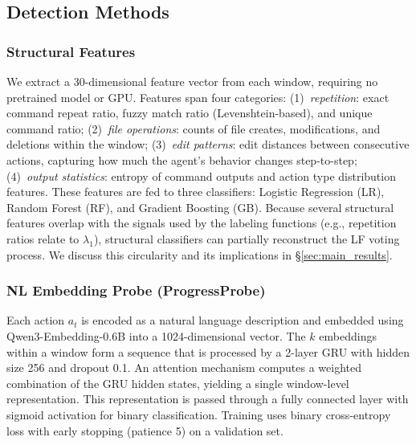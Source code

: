 \subsection{Detection Methods}
\label{sec:detection_methods}

\subsubsection{Structural Features}
\label{sec:structural_features}

We extract a 30-dimensional feature vector from each window, requiring no pretrained model or GPU.
Features span four categories:
(1)~\emph{repetition}: exact command repeat ratio, fuzzy match ratio (Levenshtein-based), and unique command ratio;
(2)~\emph{file operations}: counts of file creates, modifications, and deletions within the window;
(3)~\emph{edit patterns}: edit distances between consecutive actions, capturing how much the agent's behavior changes step-to-step;
(4)~\emph{output statistics}: entropy of command outputs and action type distribution features.
These features are fed to three classifiers: Logistic Regression (LR), Random Forest (RF), and Gradient Boosting (GB).
Because several structural features overlap with the signals used by the labeling functions (e.g., repetition ratios relate to $\lambda_1$), structural classifiers can partially reconstruct the LF voting process.
We discuss this circularity and its implications in \S\ref{sec:main_results}.

\subsubsection{NL Embedding Probe (ProgressProbe)}
\label{sec:progressprobe}

Each action $a_t$ is encoded as a natural language description and embedded using Qwen3-Embedding-0.6B \citep{zhang2025qwen3embedding} into a 1024-dimensional vector.
The $k$ embeddings within a window form a sequence that is processed by a 2-layer GRU \citep{cho2014gru} with hidden size 256 and dropout 0.1.
An attention mechanism \citep{bahdanau2015attention} computes a weighted combination of the GRU hidden states, yielding a single window-level representation.
This representation is passed through a fully connected layer with sigmoid activation for binary classification.
Training uses binary cross-entropy loss with early stopping (patience 5) on a validation set.

